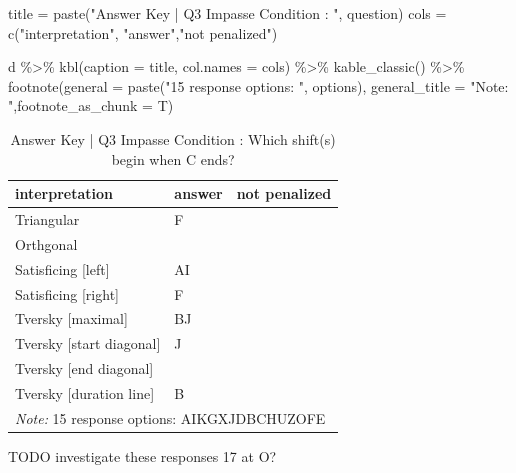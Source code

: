 \documentclass[
  letterpaper,
  DIV=11,
  numbers=noendperiod]{scrreprt}
\newenvironment{Shaded}{\begin{snugshade}}{\end{snugshade}}
\newcommand{\AttributeTok}[1]{\textcolor[rgb]{0.40,0.45,0.13}{#1}}
\newcommand{\FunctionTok}[1]{\textcolor[rgb]{0.28,0.35,0.67}{#1}}
\newcommand{\NormalTok}[1]{\textcolor[rgb]{0.00,0.23,0.31}{#1}}
\newcommand{\OtherTok}[1]{\textcolor[rgb]{0.00,0.23,0.31}{#1}}
\newcommand{\SpecialCharTok}[1]{\textcolor[rgb]{0.37,0.37,0.37}{#1}}
\newcommand{\StringTok}[1]{\textcolor[rgb]{0.13,0.47,0.30}{#1}}
\begin{document}
\begin{Shaded}
\begin{Highlighting}[]
\NormalTok{title }\OtherTok{=} \FunctionTok{paste}\NormalTok{(}\StringTok{"Answer Key | Q3 Impasse Condition : "}\NormalTok{, question)}
\NormalTok{cols }\OtherTok{=} \FunctionTok{c}\NormalTok{(}\StringTok{"interpretation"}\NormalTok{, }\StringTok{"answer"}\NormalTok{,}\StringTok{"not penalized"}\NormalTok{)}

\NormalTok{d }\SpecialCharTok{\%\textgreater{}\%} \FunctionTok{kbl}\NormalTok{(}\AttributeTok{caption =}\NormalTok{ title, }\AttributeTok{col.names =}\NormalTok{ cols) }\SpecialCharTok{\%\textgreater{}\%} \FunctionTok{kable\_classic}\NormalTok{() }\SpecialCharTok{\%\textgreater{}\%} 
  \FunctionTok{footnote}\NormalTok{(}\AttributeTok{general =} \FunctionTok{paste}\NormalTok{(}\StringTok{"15 response options: "}\NormalTok{, options), }\AttributeTok{general\_title =} \StringTok{"Note: "}\NormalTok{,}\AttributeTok{footnote\_as\_chunk =}\NormalTok{ T) }
\end{Highlighting}
\end{Shaded}

\begin{table}

\caption{Answer Key | Q3 Impasse Condition :  Which shift(s) begin when C ends?}
\centering
\begin{tabular}[t]{l|l|l}
\hline
interpretation & answer & not penalized\\
\hline
Triangular & F & \\
\hline
Orthgonal &  & \\
\hline
Satisficing [left] & AI & \\
\hline
Satisficing [right] & F & \\
\hline
Tversky [maximal] & BJ & \\
\hline
Tversky [start diagonal] & J & \\
\hline
Tversky [end diagonal] &  & \\
\hline
Tversky [duration line] & B & \\
\hline
\multicolumn{3}{l}{\rule{0pt}{1em}\textit{Note: } 15 response options:  AIKGXJDBCHUZOFE}\\
\end{tabular}
\end{table}

TODO investigate these responses 17 at O?
\end{document}
